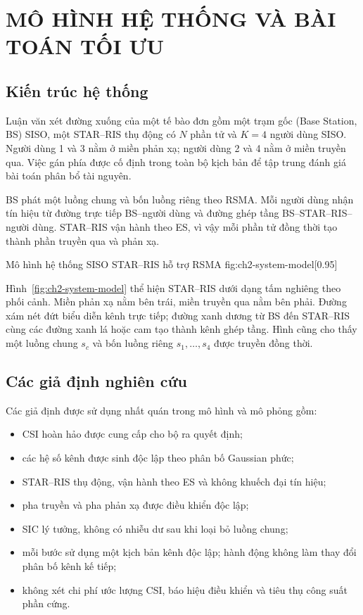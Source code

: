 \chapter{MÔ HÌNH HỆ THỐNG VÀ BÀI TOÁN TỐI ƯU}
\label{chap:system-model}

\section{Kiến trúc hệ thống}
Luận văn xét đường xuống của một tế bào đơn gồm một trạm gốc (Base Station, BS) SISO, một STAR--RIS thụ động có $N$ phần tử và $K=4$ người dùng SISO. Người dùng 1 và 3 nằm ở miền phản xạ; người dùng 2 và 4 nằm ở miền truyền qua. Việc gán phía được cố định trong toàn bộ kịch bản để tập trung đánh giá bài toán phân bổ tài nguyên.

BS phát một luồng chung và bốn luồng riêng theo RSMA. Mỗi người dùng nhận tín hiệu từ đường trực tiếp BS--người dùng và đường ghép tầng BS--STAR--RIS--người dùng. STAR--RIS vận hành theo ES, vì vậy mỗi phần tử đồng thời tạo thành phần truyền qua và phản xạ.

{Mô hình hệ thống SISO STAR--RIS hỗ trợ RSMA}
{fig:ch2-system-model}[0.95\linewidth]

Hình~\ref{fig:ch2-system-model} thể hiện STAR--RIS dưới dạng tấm nghiêng theo phối cảnh. Miền phản xạ nằm bên trái, miền truyền qua nằm bên phải. Đường xám nét đứt biểu diễn kênh trực tiếp; đường xanh dương từ BS đến STAR--RIS cùng các đường xanh lá hoặc cam tạo thành kênh ghép tầng. Hình cũng cho thấy một luồng chung $s_c$ và bốn luồng riêng $s_1,\ldots,s_4$ được truyền đồng thời.

\section{Các giả định nghiên cứu}
Các giả định được sử dụng nhất quán trong mô hình và mô phỏng gồm:
\begin{itemize}
  \item CSI hoàn hảo được cung cấp cho bộ ra quyết định;
  \item các hệ số kênh được sinh độc lập theo phân bố Gaussian phức;
  \item STAR--RIS thụ động, vận hành theo ES và không khuếch đại tín hiệu;
  \item pha truyền và pha phản xạ được điều khiển độc lập;
  \item SIC lý tưởng, không có nhiễu dư sau khi loại bỏ luồng chung;
  \item mỗi bước sử dụng một kịch bản kênh độc lập; hành động không làm thay đổi phân bố kênh kế tiếp;
  \item không xét chi phí ước lượng CSI, báo hiệu điều khiển và tiêu thụ công suất phần cứng.
\end{itemize}

